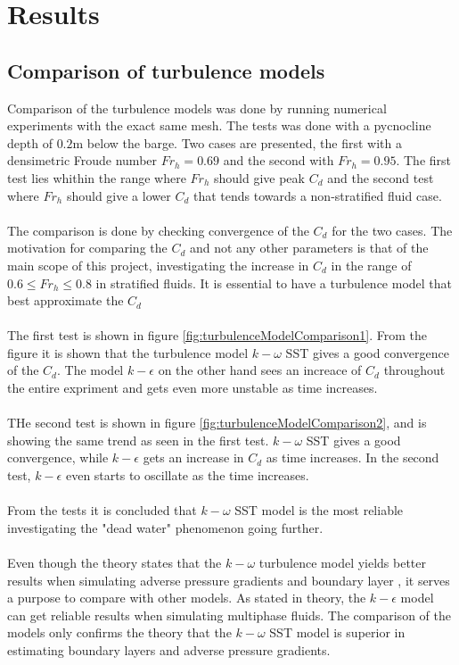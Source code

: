 \documentclass[a4paper, 12pt]{report}
\begin{document}
\chapter{Results}
\section{Comparison of turbulence models}
Comparison of the turbulence models was done by running numerical experiments with the exact same mesh. The tests was done with a pycnocline depth of $0.2$m below the barge. Two cases are presented, the first with a densimetric Froude number $Fr_h=0.69$ and the second with $Fr_h=0.95$. The first test lies whithin the range where $Fr_h$ should give peak $C_d$ and the second test where $Fr_h$ should give a lower $C_d$ that tends towards a non-stratified fluid case.\\
\\
The comparison is done by checking convergence of the $C_d$ for the two cases. The motivation for comparing the $C_d$ and not any other parameters is that of the main scope of this project, investigating the increase in $C_d$ in the range of $0.6\leq Fr_h \leq 0.8$ in stratified fluids. It is essential to have a turbulence model that best approximate the $C_d$ \\
\\
The first test is shown in figure \ref{fig:turbulenceModelComparison1}. From the figure it is shown that the turbulence model $k-\omega$ SST gives a good convergence of the $C_d$. The model $k-\epsilon$ on the other hand sees an increace of $C_d$ throughout the entire expriment and gets even more unstable as time increases.\\
\\
THe second test is shown in figure \ref{fig:turbulenceModelComparison2}, and is showing the same trend as seen in the first test. $k-\omega$ SST gives a good convergence, while $k-\epsilon$ gets an increase in $C_d$ as time increases. In the second test, $k-\epsilon$ even starts to oscillate as the time increases.\\
\\
From the tests it is concluded that $k-\omega$ SST model is the most reliable investigating the "dead water" phenomenon going further.\\
\\
Even though the theory states that the $k-\omega$ turbulence model yields better results when simulating adverse pressure gradients and boundary layer \cite{CFD}, it serves a purpose to compare with other models. As stated in theory, the $k-\epsilon$ model can get reliable results when simulating multiphase fluids. The comparison of the models only confirms the theory that the $k-\omega$ SST model is superior in estimating boundary layers and adverse pressure gradients.\\
\end{document}
